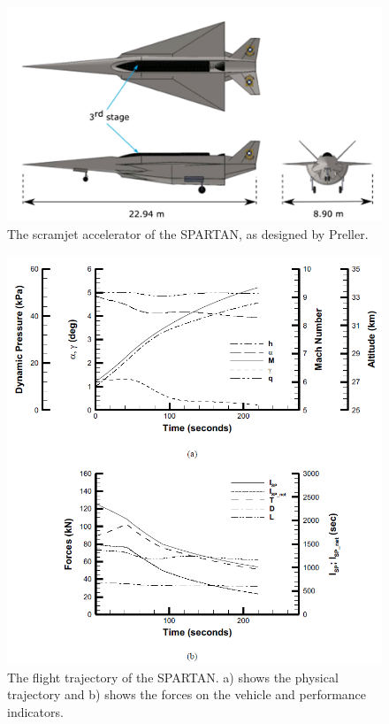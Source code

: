   \begin{figure}[ht]
  	\centering
  	\includegraphics[width=0.9\linewidth]{figures/2_literature-review/SPARTAN-Dawid}
  	\caption{The scramjet accelerator of the SPARTAN, as designed by Preller\cite{Preller2018a}.}
  	\label{fig:SPARTAN-Dawid}
  \end{figure}
  
   \begin{figure}[!ht]
   	\centering
   	\includegraphics[width=0.9\linewidth]{figures/2_literature-review/SPARTAN_traj1}
   	\caption{The flight trajectory of the SPARTAN. a) shows the physical trajectory and b) shows the forces on the vehicle and performance indicators.}
   	\label{fig:SPARTAN_traj}
   \end{figure}
  
